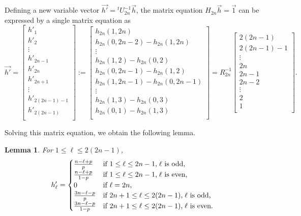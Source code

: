 \documentclass[12pt, leqno]{amsart}
\numberwithin{equation}{section}
\theoremstyle{plain}
\newtheorem{lem}{Lemma}[section]
\theoremstyle{definition}
\newcommand{\0}{\mathbf{0}}
\begin{document}
Defining a new variable vector $\vec{h'}={}^tU_{2n}^{-1}\vec{h}$, the matrix equation $H_{2n} \vec{h}=\vec{1}$ can be expressed by a single matrix equation as 
\begin{equation*}
\vec{h'}=
\begin{bmatrix}
h'_1\\
h'_2\\
\vdots\\
h'_{2n-1}\\
h'_{2n}\\
h'_{2n+1}\\
\vdots\\
h'_{2(2n-1)-1}\\
h'_{2(2n-1)}\\
\end{bmatrix}
:=
\begin{bmatrix}
h_{2n}(1,2n)\\
h_{2n}(0,2n-2)-h_{2n}(1,2n)\\
\vdots\\
h_{2n}(1,2)-h_{2n}(0,2)\\
h_{2n}(0,2n-1)-h_{2n}(1,2)\\
h_{2n}(1,2n-1)-h_{2n}(0,2n-1)\\
\vdots\\
h_{2n}(1,3)-h_{2n}(0,3)\\
h_{2n}(0,1)-h_{2n}(1,3)\\
\end{bmatrix}
=R_{2n}^{-1}
\begin{bmatrix}
2(2n-1)\\
2(2n-1)-1\\
\vdots\\
2n\\
2n-1\\
2n-2\\
\vdots\\
2\\
1\\
\end{bmatrix}.
\end{equation*}

Solving this matrix equation, we obtain the following lemma. 
\begin{lem}\label{2.2}
For $1\leq \ell\leq 2(2n-1)$,
\[
h'_\ell=\begin{cases}
\frac{n-\ell+p}{p} &\text{if $1\leq \ell\leq 2n-1$,\;$\ell$ is odd,}\\
\frac{n-\ell+p}{1-p} &\text{if $1\leq \ell\leq 2n-1$,\;$\ell$ is even,}\\
0 &\text{if $\ell=2n$,}\\
\frac{3n-\ell-p}{p} &\text{if $2n+1\leq \ell\leq 2(2n-1)$,\;$\ell$ is odd,}\\
\frac{3n-\ell-p}{1-p} &\text{if $2n+1\leq \ell\leq 2(2n-1)$,\;$\ell$ is even.}
\end{cases}
\]
\end{lem}
\end{document}
